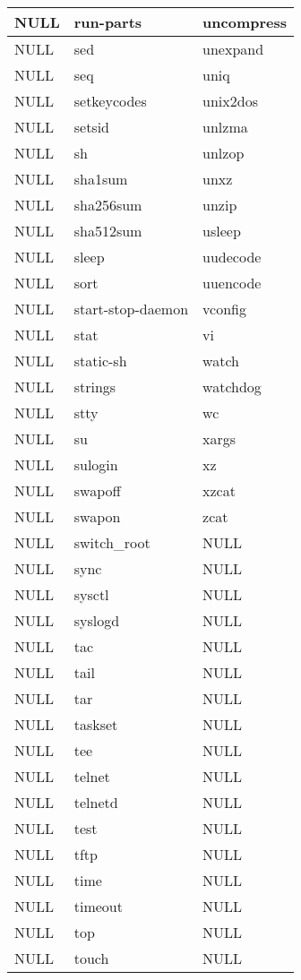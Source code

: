\begin{longtable}{llp{64mm}}
NULL & run-parts & uncompress \\ \hline
NULL & sed & unexpand \\ \hline
NULL & seq & uniq \\ \hline
NULL & setkeycodes & unix2dos \\ \hline
NULL & setsid & unlzma \\ \hline
NULL & sh & unlzop \\ \hline
NULL & sha1sum & unxz \\ \hline
NULL & sha256sum & unzip \\ \hline
NULL & sha512sum & usleep \\ \hline
NULL & sleep & uudecode \\ \hline
NULL & sort & uuencode \\ \hline
NULL & start-stop-daemon & vconfig \\ \hline
NULL & stat & vi \\ \hline
NULL & static-sh & watch \\ \hline
NULL & strings & watchdog \\ \hline
NULL & stty & wc \\ \hline
NULL & su & xargs \\ \hline
NULL & sulogin & xz \\ \hline
NULL & swapoff & xzcat \\ \hline
NULL & swapon & zcat \\ \hline
NULL & switch_root & NULL \\ \hline
NULL & sync & NULL \\ \hline
NULL & sysctl & NULL \\ \hline
NULL & syslogd & NULL \\ \hline
NULL & tac & NULL \\ \hline
NULL & tail & NULL \\ \hline
NULL & tar & NULL \\ \hline
NULL & taskset & NULL \\ \hline
NULL & tee & NULL \\ \hline
NULL & telnet & NULL \\ \hline
NULL & telnetd & NULL \\ \hline
NULL & test & NULL \\ \hline
NULL & tftp & NULL \\ \hline
NULL & time & NULL \\ \hline
NULL & timeout & NULL \\ \hline
NULL & top & NULL \\ \hline
NULL & touch & NULL \\ \hline

\end{longtable}
